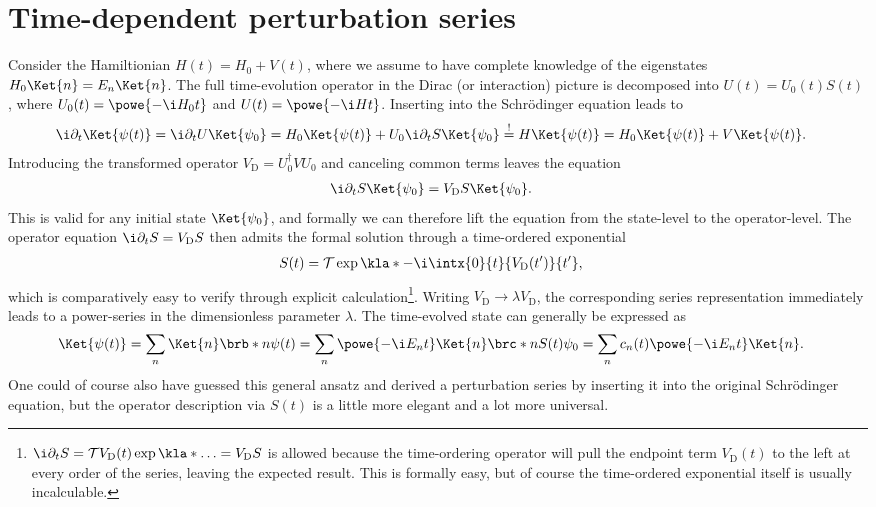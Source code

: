 \documentclass[english, parskip=full]{scrartcl}
\title{\Title}
\author{\Author}
\date{\today}
\newcommand{\D}{\text{D}}
\begin{document}
\maketitle  %

\section{Time-dependent perturbation series}
Consider the Hamiltionian $H(t)=H_0+V(t)$, where we assume to have complete knowledge of the eigenstates $H_0\Ket{n}=E_n\Ket{n}$.
The full time-evolution operator in the Dirac (or interaction) picture is decomposed into $U(t)=U_0(t)S(t)$, where $U_0(t)=\powe{-\i H_0t}$ and $U(t)=\powe{-\i Ht}$.
Inserting into the Schrödinger equation leads to
\begin{align}
\i\partial_t \Ket{\psi(t)} &= \i\partial_t U\Ket{\psi_0} = H_0\Ket{\psi(t)} + U_0\i\partial_t S\Ket{\psi_0} \overset{!}{=} H\Ket{\psi(t)} = H_0\Ket{\psi(t)} + V\Ket{\psi(t)}.
\end{align}
Introducing the transformed operator $V_\D = U_0^\dagger VU_0$ and canceling common terms leaves the equation
\begin{align}
\i\partial_t S\Ket{\psi_0} &= V_\D S\Ket{\psi_0}.
\end{align}
This is valid for any initial state $\Ket{\psi_0}$, and formally we can therefore lift the equation from the state-level to the operator-level.
The operator equation $\i\partial_t S=V_\D S$ then admits the formal solution through a time-ordered exponential
\begin{align}
S(t) &= \mathcal{T} \exp\kla*{-\i \intx{0}{t}{V_\D(t')}{t'}},
\end{align}
which is comparatively easy to verify through explicit calculation\footnote{$\i\partial_t S = \mathcal{T} V_\D(t) \exp\kla*{\dots} = V_\D S$ is allowed because the time-ordering operator will pull the endpoint term $V_\D(t)$ to the left at every order of the series, leaving the expected result. This is formally easy, but of course the time-ordered exponential itself is usually incalculable.}.
Writing $V_\D \rightarrow \lambda V_\D$, the corresponding series representation immediately leads to a power-series in the dimensionless parameter $\lambda$.
The time-evolved state can generally be expressed as
\begin{align}
\Ket{\psi(t)} &= \sum_n \Ket{n} \brb*{n}{\psi(t)} = \sum_n \powe{-\i E_n t}\Ket{n} \brc*{n}{S(t)}{\psi_0} = \sum_n c_n(t) \powe{-\i E_n t}\Ket{n}.
\end{align}
One could of course also have guessed this general ansatz and derived a perturbation series by inserting it into the original Schrödinger equation, but the operator description via $S(t)$ is a little more elegant and a lot more universal.
\end{document}
